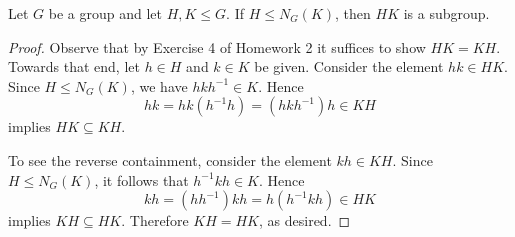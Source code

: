 \documentclass[10pt]{amsart}
\begin{document}
\begin{lem}\label{normalizer}
  Let $G$ be a group and let $H,K \leq G$.
  If $H \leq N_G(K)$, then $HK$ is a subgroup.
  
  \begin{proof}
    Observe that by Exercise 4 of Homework 2 it suffices to show $HK = KH$.
    Towards that end, let $h \in H$ and $k \in K$ be given.
    Consider the element $hk \in HK$.
    Since $H \leq N_G(K)$, we have $hkh^{-1} \in K$.
    Hence $$hk = hk(h^{-1}h) = (hkh^{-1})h \in KH$$ implies $HK \subseteq KH$.
    
    To see the reverse containment, consider the element $kh \in KH$.
    Since $H \leq N_G(K)$, it follows that $h^{-1}kh \in K$.
    Hence $$kh = (hh^{-1})kh = h(h^{-1}kh) \in HK$$ implies $KH \subseteq HK$.
    Therefore $KH = HK$, as desired.
  \end{proof}
\end{lem}
\end{document}
